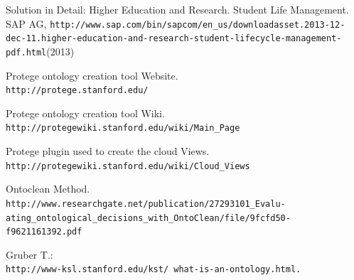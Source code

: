 \documentclass{article}    %
\begin{document}
%
%
\begin{thebibliography}{99}
%
Solution in Detail: Higher Education and Research. Student Life Management.
SAP AG, \texttt{http://www.sap.com/bin/sapcom/en\_us/downloadasset.2013-12-dec-11.higher-education-and-research-student-lifecycle-\newline management-pdf.html}(2013)

Protege ontology creation tool Website.\\
\texttt{http://protege.stanford.edu/}

Protege ontology creation tool Wiki.\\
\texttt{http://protegewiki.stanford.edu/wiki/Main\_Page}

Protege plugin used to create the cloud Views.\\
\texttt{http://protegewiki.stanford.edu/wiki/Cloud\_Views}

Ontoclean Method.\\
\texttt{http://www.researchgate.net/publication/27293101\_Evalu-\newline
ating\_ontological\_decisions\_with\_OntoClean/file/9fcfd50-\newline
f9621161392.pdf}

Gruber T.:
\\
\texttt{http://www-ksl.stanford.edu/kst/ what-is-an-ontology.html.} 



\end{thebibliography}
\end{document}
